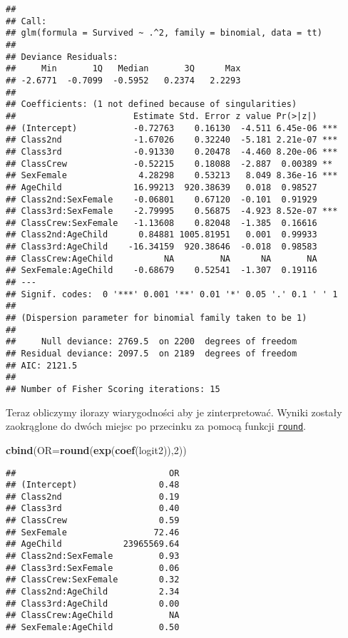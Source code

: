 \documentclass[polish,]{book}
\newenvironment{Shaded}{\begin{snugshade}}{\end{snugshade}}
\newcommand{\DataTypeTok}[1]{\textcolor[rgb]{0.13,0.29,0.53}{#1}}
\newcommand{\DecValTok}[1]{\textcolor[rgb]{0.00,0.00,0.81}{#1}}
\newcommand{\KeywordTok}[1]{\textcolor[rgb]{0.13,0.29,0.53}{\textbf{#1}}}
\newcommand{\NormalTok}[1]{#1}
\begin{document}
\begin{verbatim}
## 
## Call:
## glm(formula = Survived ~ .^2, family = binomial, data = tt)
## 
## Deviance Residuals: 
##     Min       1Q   Median       3Q      Max  
## -2.6771  -0.7099  -0.5952   0.2374   2.2293  
## 
## Coefficients: (1 not defined because of singularities)
##                       Estimate Std. Error z value Pr(>|z|)    
## (Intercept)           -0.72763    0.16130  -4.511 6.45e-06 ***
## Class2nd              -1.67026    0.32240  -5.181 2.21e-07 ***
## Class3rd              -0.91330    0.20478  -4.460 8.20e-06 ***
## ClassCrew             -0.52215    0.18088  -2.887  0.00389 ** 
## SexFemale              4.28298    0.53213   8.049 8.36e-16 ***
## AgeChild              16.99213  920.38639   0.018  0.98527    
## Class2nd:SexFemale    -0.06801    0.67120  -0.101  0.91929    
## Class3rd:SexFemale    -2.79995    0.56875  -4.923 8.52e-07 ***
## ClassCrew:SexFemale   -1.13608    0.82048  -1.385  0.16616    
## Class2nd:AgeChild      0.84881 1005.81951   0.001  0.99933    
## Class3rd:AgeChild    -16.34159  920.38646  -0.018  0.98583    
## ClassCrew:AgeChild          NA         NA      NA       NA    
## SexFemale:AgeChild    -0.68679    0.52541  -1.307  0.19116    
## ---
## Signif. codes:  0 '***' 0.001 '**' 0.01 '*' 0.05 '.' 0.1 ' ' 1
## 
## (Dispersion parameter for binomial family taken to be 1)
## 
##     Null deviance: 2769.5  on 2200  degrees of freedom
## Residual deviance: 2097.5  on 2189  degrees of freedom
## AIC: 2121.5
## 
## Number of Fisher Scoring iterations: 15
\end{verbatim}

Teraz obliczymy ilorazy wiarygodności aby je zinterpretować. Wyniki zostały zaokrąglone do dwóch miejsc po przecinku za pomocą funkcji \href{https://rdrr.io/r/base/Round.html}{\texttt{round}}.

\begin{Shaded}
\begin{Highlighting}[]
\KeywordTok{cbind}\NormalTok{(}\DataTypeTok{OR=}\KeywordTok{round}\NormalTok{(}\KeywordTok{exp}\NormalTok{(}\KeywordTok{coef}\NormalTok{(logit2)),}\DecValTok{2}\NormalTok{))}
\end{Highlighting}
\end{Shaded}

\begin{verbatim}
##                              OR
## (Intercept)                0.48
## Class2nd                   0.19
## Class3rd                   0.40
## ClassCrew                  0.59
## SexFemale                 72.46
## AgeChild            23965569.64
## Class2nd:SexFemale         0.93
## Class3rd:SexFemale         0.06
## ClassCrew:SexFemale        0.32
## Class2nd:AgeChild          2.34
## Class3rd:AgeChild          0.00
## ClassCrew:AgeChild           NA
## SexFemale:AgeChild         0.50
\end{verbatim}
\end{document}
